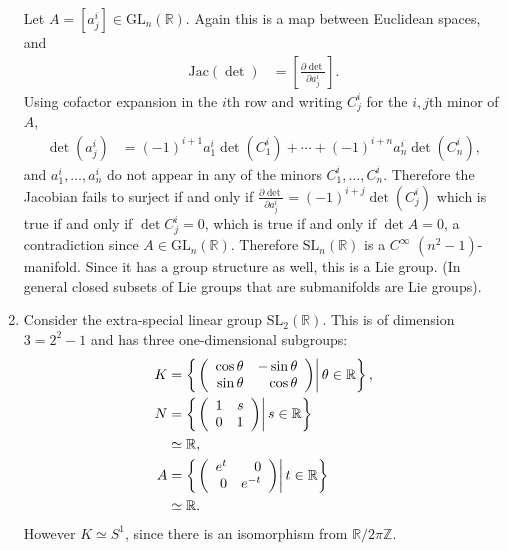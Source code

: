 \begin{xmpl}
\begin{enumerate}
{      Let $A = [a^i_j] \in \mathrm{GL}_n(\mathbb{R})$. Again this is a
      map between Euclidean spaces, and
      \begin{align*}
         \mathrm{Jac}(\det)
      &= \left[ \frac{\partial \det}{\partial a^i_j} \right].
      \end{align*}
      Using cofactor expansion in the $i$th row and writing
      $C^i_j$ for the $i,j$th minor of $A$,
      \begin{align*}
         \det(a^i_j)
      &= (-1)^{i+1} a_1^i \det(C_1^i)
       + \cdots
       + (-1)^{i+n} a_n^i \det(C_n^i),
      \end{align*}
      and $a_1^i, \dots, a_n^i$ do not appear in any of the minors
      $C^i_1, \dots, C^i_n$. Therefore the Jacobian fails to surject
      if and only if
      $
        \frac{\partial \det}{\partial a^i_j}
      = (-1)^{i+j} \det(C_j^i)
      $
      which is true if and only if $\det C_j^i = 0$, which is true if
      and only if $\det A = 0$, a contradiction since
      $A \in \mathrm{GL}_n(\mathbb{R})$. Therefore
      $\mathrm{SL}_n(\mathbb{R})$ is a $C^\infty$ $(n^2 -
      1)$-manifold. Since it has a group structure as well, this is a
      Lie group. (In general closed subsets of Lie groups that are
      submanifolds are Lie groups).
    }
    \item{
      Consider the extra-special linear group
      $\mathrm{SL}_2(\mathbb{R})$. This is of dimension $3 = 2^2 - 1$
      and has three one-dimensional subgroups:
      \begin{align*}
         K
      &= \left\{
           \left.
             \left(
               \begin{array}{r r}
                 \cos \theta & -\sin \theta \\
                 \sin \theta &  \cos \theta
               \end{array}
             \right)
           \right\vert
           \theta \in \mathbb{R}
         \right\}, \\
         N
      &= \left\{
           \left.
             \left(
               \begin{array}{r r}
                 1 & s \\
                 0 & 1
               \end{array}
             \right)
           \right\vert
           s \in \mathbb{R}
         \right\} \\
      &\simeq \mathbb{R}, \\
         A
      &= \left\{
           \left.
             \left(
               \begin{array}{r r}
                 e^t & 0 \\
                 0   & e^{-t}
               \end{array}
             \right)
           \right\vert
           t \in \mathbb{R}
         \right\} \\
      &\simeq \mathbb{R}.
      \end{align*}
      However $K \simeq S^1$, since there is an isomorphism from
      $\mathbb{R} / 2 \pi \mathbb{Z}$.

}
\end{enumerate}
\end{xmpl}
